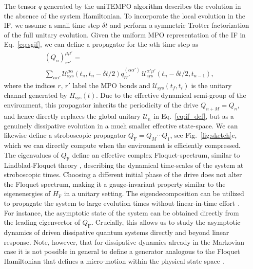\documentclass[aps,prb, twocolumn,superscriptaddress]{revtex4-2}
\begin{document}
The tensor $q$ generated by the uniTEMPO algorithm describes the evolution in the absence of the system Hamiltonian. To incorporate the local evolution in the IF, we assume a small time-step $\delta t$ and perform a symmetric Trotter factorization of the full unitary evolution.  Given the uniform MPO representation of the IF in Eq.~\eqref{eq:sgif}, we can define a propagator for the $n$th time step as
\begin{equation}
\begin{split}
&({Q}_n)^{\mu\mu'}_{rr'}=\\&\sum_{\alpha\alpha'} \mathcal{U}_\mathrm{sys}^{\mu\alpha}(t_{n},t_{n}-{\delta t}/{2})q^{(\alpha\alpha')}_{rr'}\,\mathcal{U}_\mathrm{sys}^{\alpha'\mu'}(t_{n}-{\delta t}/{2},t_{n-1}),
\end{split}
\end{equation}
where the indices $r,\,r'$ label the MPO bonds and $\mathcal{U}_\mathrm{sys}(t_f,t_i)$ is the unitary channel generated by $H_\mathrm{sys}(t)$. Due to the effective dynamical semi-group of the environment, this propagator inherits the periodicity of the drive $Q_{n+M}=Q_n$, and hence directly replaces the global unitary $\mathcal{U}_n$ in Eq.~\eqref{eq:if_def}, but as a genuinely dissipative evolution in a much smaller effective state-space. We can likewise define a stroboscopic propagator $Q_\mathrm{F}=Q_M\cdots Q_1$, see Fig.~\ref{fig:sketch}c, which we can directly compute when the environment is efficiently compressed. The eigenvalues of $Q_\mathrm{F}$ define an effective complex Floquet-spectrum, similar to Lindblad-Floquet theory \cite{Schnell2020Mar,Chen2024May}, describing the dynamical time-scales of the system at stroboscopic times. Choosing a different initial phase of the drive does not alter the Floquet spectrum, making it a gauge-invariant property similar to the eigenenergies of $H_\mathrm{F}$ in a unitary setting. The eigendecomposition can be utilized to propagate the system to large evolution times without linear-in-time effort \cite{sonner2025Semi}. For instance, the asymptotic state of the system can be obtained directly from the leading eigenvector of $Q_\mathrm{F}$. Crucially, this allows us to study the asymptotic dynamics of driven dissipative quantum systems directly and beyond linear response. Note, however, that for dissipative dynamics already in the Markovian case it is not possible in general to define a generator analogous to the Floquet Hamiltonian that defines a micro-motion within the physical state space \cite{Schnell2020Mar}.
\end{document}
